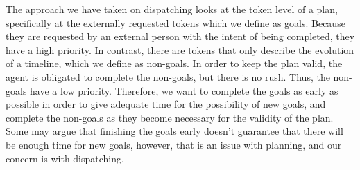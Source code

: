 The approach we have taken on dispatching looks at the token level of a plan,
specifically at the externally requested tokens which we define as goals.
Because they are requested by an external person with the intent of being 
completed, they have a high priority. In contrast, there are tokens that only describe the
evolution of a timeline, which we define as non-goals. In order to keep the plan 
valid, the agent is obligated to complete the non-goals, but there is no rush. Thus, the
non-goals have a low priority. Therefore, we want to complete the goals
as early as possible in order to give adequate time for the possibility of new
goals, and complete the non-goals as they become necessary for the validity of the plan. 
Some may argue that finishing the goals early doesn't guarantee that
there will be enough time for new goals, however, that is an issue with planning, 
and our concern is with dispatching.


